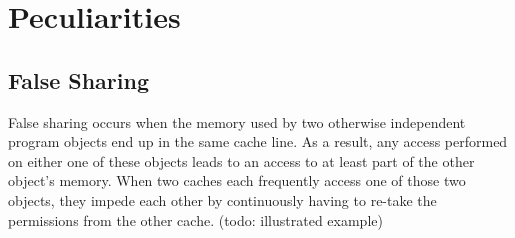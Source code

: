 \section{Peculiarities}

\subsection{False Sharing}
\label{sec:false_sharing}
False sharing occurs when the memory used by two otherwise independent program
objects end up in the same cache line. As a result, any access performed on
either one of these objects leads to an access to at least part of the other
object's memory. When two caches each frequently access one of those two
objects, they impede each other by continuously having to re-take the
permissions from the other cache.
(todo: illustrated example)
